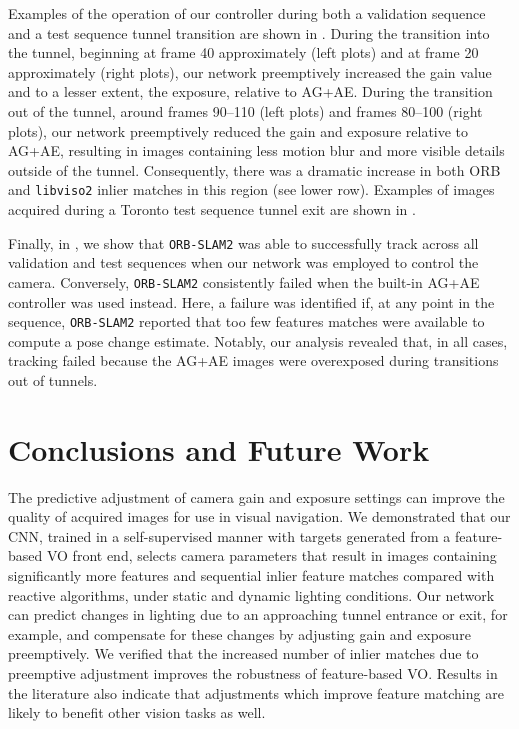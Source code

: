 \documentclass[letterpaper, 10pt, journal, twoside]{IEEEtran}
\begin{document}
Examples of the operation of our controller during both a validation sequence and a test sequence tunnel transition are shown in .
During the transition into the tunnel, beginning at frame 40 approximately (left plots) and at frame 20 approximately (right plots), our network preemptively increased the gain value and to a lesser extent, the exposure, relative to AG+AE. 
During the transition out of the tunnel, around frames 90--110 (left plots) and frames 80--100 (right plots), our network preemptively reduced the gain and exposure relative to AG+AE, resulting in images containing less motion blur and more visible details outside of the tunnel. 
Consequently, there was a dramatic increase in both ORB and \texttt{libviso2} inlier matches in this region (see  lower row).
Examples of images acquired during a Toronto test sequence tunnel exit are shown in .

Finally, in , we show that \texttt{ORB-SLAM2} was able to successfully track across all validation and test sequences when our network was employed to control the camera.
Conversely, \texttt{ORB-SLAM2} consistently failed when the built-in AG+AE controller was used instead. Here, a failure was identified if, at any point in the sequence, \texttt{ORB-SLAM2} reported that too few features matches were available to compute a pose change estimate. Notably, our analysis revealed that, in all cases, tracking failed because the AG+AE images were overexposed during transitions out of tunnels.

\section{Conclusions and Future Work}
\label{sec:conclusion}

The predictive adjustment of camera gain and exposure settings can improve the quality of acquired images for use in visual navigation. 
We demonstrated that our CNN, trained in a self-supervised manner with targets generated from a feature-based VO front end, selects camera parameters that result in images containing significantly more features and sequential inlier feature matches compared with reactive algorithms, under static and dynamic lighting conditions.
Our network can predict changes in lighting due to an approaching tunnel entrance or exit, for example, and compensate for these changes by adjusting gain and exposure preemptively.
We verified that the increased number of inlier matches due to preemptive adjustment improves the robustness of feature-based VO.
Results in the literature also indicate that adjustments which improve feature matching are likely to benefit other vision tasks as well\mbox{\cite{Shim2014,Shin2019}}.
  
\end{document}
